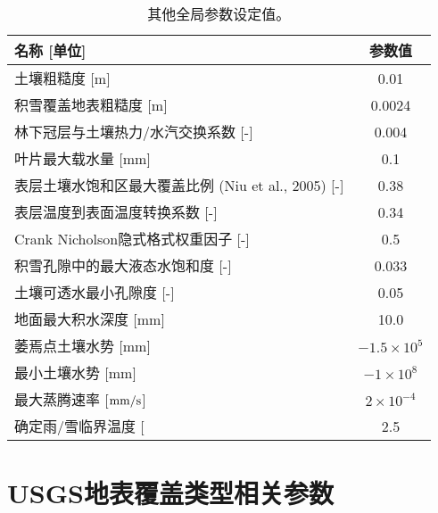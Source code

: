 \begin{table}[]
\centering
\caption{其他全局参数设定值。}
\label{tab:其他全局参数设定值}
\begin{tabular}{@{}lc@{}}
\toprule
名称 {[}单位{]}                               & 参数值      \\ \midrule
土壤粗糙度 {[}m{]}                             & 0.01     \\
积雪覆盖地表粗糙度 {[}m{]}                         & 0.0024   \\
林下冠层与土壤热力/水汽交换系数 {[}-{]}                  & 0.004    \\
叶片最大载水量 {[}mm{]}                          & 0.1      \\
表层土壤水饱和区最大覆盖比例 (Niu et al., 2005) {[}-{]} & 0.38     \\
表层温度到表面温度转换系数 {[}-{]}                     & 0.34     \\
Crank Nicholson隐式格式权重因子 {[}-{]}           & 0.5      \\
积雪孔隙中的最大液态水饱和度 {[}-{]}                    & 0.033    \\
土壤可透水最小孔隙度 {[}-{]}                        & 0.05     \\
地面最大积水深度 {[}mm{]}                         & 10.0     \\
萎焉点土壤水势 {[}mm{]}                          & $-1.5\times 10^5$ \\
最小土壤水势 {[}mm{]}                           & $-1\times 10^8$   \\
最大蒸腾速率 {[}$\rm mm/s${]}                         & $2\times 10^{-4}$   \\
确定雨/雪临界温度 {[}\textcelsius {]}                         & 2.5      \\ \bottomrule
\end{tabular}
\end{table}


\chapter{USGS地表覆盖类型相关参数}\label{USGS地表覆盖类型相关参数}

